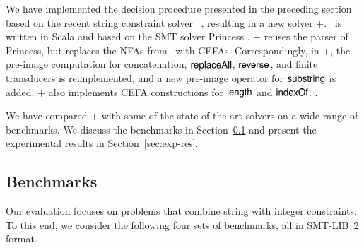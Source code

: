 
We have implemented the decision procedure presented in the preceding section based on the recent string constraint solver \ostrich~\cite{CHL+19}, resulting in a new solver \ostrich+. \ostrich\ is  written in Scala and based on the SMT solver Princess \cite{princess08}. \ostrich+ reuses the parser of Princess, but replaces the NFAs from \ostrich\ with CEFAs. Correspondingly, in \ostrich+, the pre-image  computation for concatenation, $\mathsf{replaceAll}$, $\mathsf{reverse}$, and finite transducers is reimplemented, and a new pre-image operator for $\mathsf{substring}$ is added. \ostrich+ also implements CEFA constructions for $\mathsf{length}$ and $\mathsf{indexOf}$.  \iftoggle{full}{More details can be found in Appendix~\ref{appendix:impl}}{More details can be found in the full version~\cite{atva20-full}}.

We have compared {\ostrich}+ with some of the state-of-the-art solvers on a wide range of benchmarks.  
We  discuss the benchmarks in Section~\ref{sec:bench} and %
present the experimental results in Section~\ref{sec:exp-res}.


\vspace{-3mm}
\subsection{Benchmarks}\label{sec:bench}
Our evaluation focuses on problems that combine string with integer constraints.  To this end, we consider the following four sets of
benchmarks, all in SMT-LIB~2 format.

